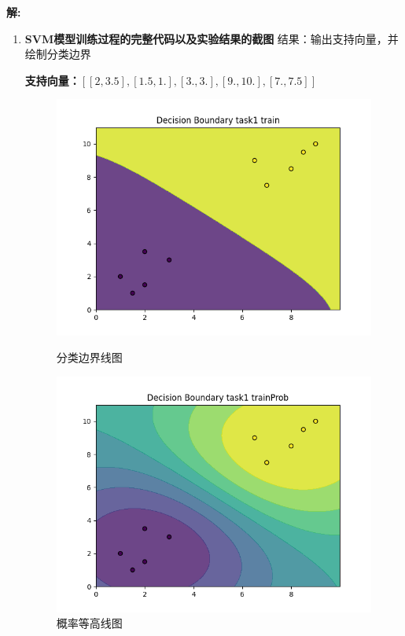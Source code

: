 \documentclass[8pt]{article}
\begin{document}
\textbf{\large 解:}
    \textbf{\color{red}{代码见 Prob2; 输出见 Prob2/Out}}
\begin{enumerate}
    \item \textbf{SVM模型训练过程的完整代码以及实验结果的截图} 结果：输出支持向量，并绘制分类边界

    \textbf{支持向量：\([
    [ 2, 3.5],
    [1.5, 1.],
    [ 3.,   3. ],
    [ 9.,  10. ],
    [ 7.,  7.5]]\)
    }
    \begin{figure}[H]
    \centering
    \begin{minipage}{0.45\textwidth}
        \centering
        \includegraphics[width=\textwidth]{./Prob2/out/task1/decision_boundary_train.png}
        \caption{分类边界线图}
        \label{fig:decision_boundary_train}
    \end{minipage}
    \hfill
    \begin{minipage}{0.45\textwidth}
        \centering
        \includegraphics[width=\textwidth]{./Prob2/out/task1/decision_boundary_trainProb.png}
        \caption{概率等高线图}
        \label{fig:decision_boundary_trainProb}
    \end{minipage}
    \hfill
\end{figure}
    

\end{enumerate}
\end{document}
